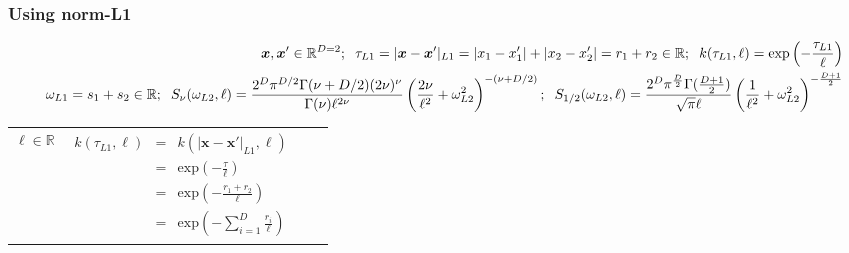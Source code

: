 \documentclass[onecolumn,a4paper,11pt]{article}
\begin{document}
\begin{landscape}
\newpage
\subsubsection{Using norm-L1}
\vspace{-5mm}

\begin{table}[H]
\small
\begin{eqnarray*}
\vspace{-20mm}
&&\bm{x}, \bm{x}' \in \mathbb{R}^{D=2}; \hspace{2mm}\tau_{L1} =|\bm{x}-\bm{x}'|_{L1} = |x_1-x_1'|+|x_2-x_2'| = r_1+r_2 \in \mathbb{R}; \hspace{2mm} k(\tau_{L1},\ell) = \mathrm{exp}\left(- \frac{\tau_{L1}}{\ell} \right)\\
&& \omega_{L1}= s_1+s_2 \in \mathbb{R}; \hspace{2mm} S_{\nu}(\omega_{L2},\ell) = \frac{2^D\pi^{D/2}\Gamma(\nu+D/2)(2\nu)^{\nu}}{\Gamma(\nu)\ell^{2\nu}}\left(\frac{2\nu}{\ell^2}+\omega_{L2}^2 \right)^{-(\nu+D/2)}; \hspace{2mm} S_{1/2}(\omega_{L2},\ell) = \frac{2^D\pi^{\frac{D}{2}}\Gamma(\frac{D+1}{2})}{\sqrt{\pi}\ell}\left(\frac{1}{\ell^2}+\omega_{L2}^2 \right)^{-\frac{D+1}{2}}
\end{eqnarray*}
\normalsize
  \begin{center}
    \begin{tabular}{|c|c|c|c|}
       \hline
       
       \multicolumn{1}{|p{1.5cm}|}{
       \vspace{1mm}
       $\ell \in \mathbb{R}$
       }
       
        & \multicolumn{1}{|p{5.7cm}|}{\small
         \begin{eqnarray*}
		k(\tau_{L1},\ell) &=& k(|\bm{x}-\bm{x}'|_{L1},\ell)\\
		 &=& \mathrm{exp}\left(- \frac{\tau}{\ell} \right) \\
		&=& \mathrm{exp}\left(- \frac{r_1 + r_2}{\ell} \right)\\
		&=& \mathrm{exp}\left(- \sum_{i=1}^{D}\frac{r_i}{\ell} \right)
         \end{eqnarray*}
       }
       

\end{tabular}
\end{center}
\end{table}
\end{landscape}
\end{document}
